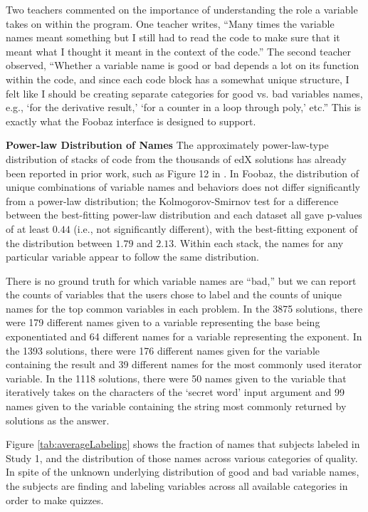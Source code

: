{{Two teachers commented on the importance of understanding the role a variable takes on within the program. One teacher writes, ``Many times the variable names meant something but I still had to read the code to make sure that it meant what I thought it meant in the context of the code.'' The second teacher observed, ``Whether a variable name is good or bad depends a lot on its function within the code, and since each code block has a somewhat unique structure, I felt like I should be creating separate categories for good vs. bad variables names, e.g., `for the derivative result,' `for a counter in a loop through poly,' etc.'' This is exactly what the Foobaz interface is designed to support. 

\textbf{Power-law Distribution of Names}
The approximately power-law-type distribution of stacks of code from the thousands of edX solutions has already been reported in prior work, such as Figure 12 in \cite{overcode}. In Foobaz, the distribution of unique combinations of variable names and behaviors does not differ
significantly from a power-law distribution; the Kolmogorov-Smirnov test for a difference between the best-fitting power-law distribution and each dataset all gave p-values of at least $0.44$ (i.e., not significantly different), with the best-fitting exponent of the distribution between
$1.79$ and $2.13$. Within each stack, the names for any particular variable appear to follow the same distribution.

There is no ground truth for which variable names are ``bad,'' but we can report the counts of variables that the users chose to label and the counts of unique names for the top common variables in each problem. In the 3875  solutions, there were 179 different names given to a variable representing the base being exponentiated and 64 different names for a variable representing the exponent. In the 1393  solutions, there were 176 different names given for the variable containing the result and 39 different names for the most commonly used iterator variable. In the 1118  solutions, there were 50 names given to the variable that iteratively takes on the characters of the `secret word' input argument and 99 names given to the variable containing the string most commonly returned by solutions as the answer. 

Figure \ref{tab:averageLabeling} shows the fraction of names that subjects labeled in Study 1, and the distribution of those names across various categories of quality. In spite of the unknown underlying distribution of good and bad variable names, the subjects are finding and labeling variables across all available categories in order to make quizzes.
 
}}
